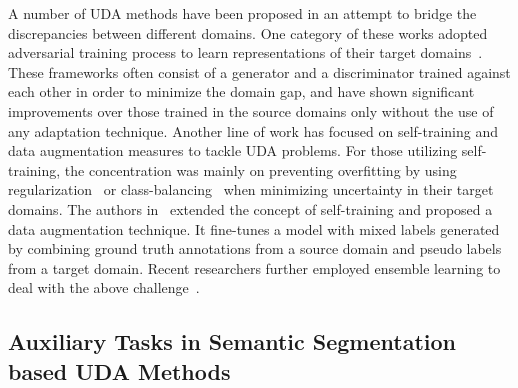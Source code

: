 \documentclass{bmvc2k}
\begin{document}
A number of UDA methods have been proposed in an attempt to bridge the discrepancies between different domains. One category of these works adopted adversarial training process to learn representations of their target domains~\cite{vu2019advent,tsai2019domain,xu2019adversarial,wu2020dual,vu2019dada}. These frameworks often consist of a generator and a discriminator trained against each other in order to minimize the domain gap, and have shown significant improvements over those trained in the source domains only without the use of any adaptation technique. Another line of work has focused on
self-training and data augmentation measures to tackle UDA problems. For those utilizing self-training, the concentration was mainly on preventing overfitting by using regularization~\cite{zou2020confidence, zheng2020rectifying} or class-balancing~\cite{mei2020instance, zou2018domain} when minimizing uncertainty in their target domains. The authors in~\cite{tranheden2020dacs} extended the concept of self-training and proposed a data augmentation technique. 
It fine-tunes a model with mixed labels generated by combining ground truth annotations from a source domain and pseudo labels from a target domain. Recent researchers further employed
ensemble learning to deal with the above challenge~\cite{Chao_2021_CVPR}. 


\subsection{Auxiliary Tasks in Semantic Segmentation based UDA Methods}
\label{subsec::aux_task_segmentation_UDA}
\end{document}
